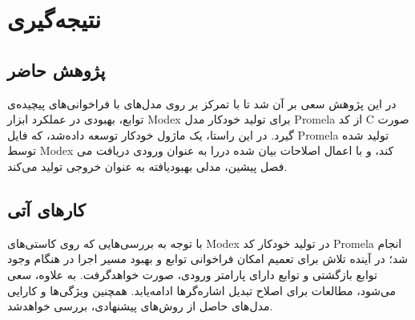 \chapter{نتیجه‌گیری}

\section{پژوهش حاضر}
در این پژوهش سعی بر آن شد تا با تمرکز بر روی مدل‌های با فراخوانی‌های پیچیده‌ی توابع، بهبودی در عملکرد ابزار Modex برای تولید خودکار مدل Promela از کد C صورت گیرد. در این راستا، یک ماژول خودکار توسعه داده‌شد، که فایل Promela تولید شده توسط Modex را به عنوان ورودی دریافت می‎‌کند، و با اعمال اصلاحات بیان شده در فصل پیشین، مدلی بهبودیافته به عنوان خروجی تولید می‌کند.

\section{کارهای آتی}
با توجه به بررسی‌هایی که روی کاستی‌های Modex در تولید خودکار کد Promela انجام شد؛ در آینده تلاش برای تعمیم امکان فراخوانی توابع و بهبود مسیر اجرا در هنگام وجود توابع بازگشتی و توابع دارای پارامتر ورودی، صورت خواهد‌گرفت. به علاوه، سعی می‌شود، مطالعات برای اصلاح تبدیل اشاره‌گرها ادامه‌یابد. همچنین ویژگی‌ها و کارایی مدل‌های حاصل از روش‌های پیشنهادی، بررسی خواهدشد.